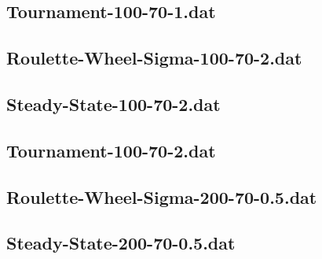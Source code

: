 \documentclass[titlepage, a4paper, 12pt]{article}
\begin{document}
\subsection{Tournament-100-70-1.dat}\label{Tournament-100-70-1.dat}
\begin{footnotesize}
  
\end{footnotesize}

\subsection{Roulette-Wheel-Sigma-100-70-2.dat}\label{Roulette-Wheel-Sigma-100-70-2.dat}
\begin{footnotesize}
  
\end{footnotesize}

\subsection{Steady-State-100-70-2.dat}\label{Steady-State-100-70-2.dat}
\begin{footnotesize}
  
\end{footnotesize}

\subsection{Tournament-100-70-2.dat}\label{Tournament-100-70-2.dat}
\begin{footnotesize}
  
\end{footnotesize}

\subsection{Roulette-Wheel-Sigma-200-70-0.5.dat}\label{Roulette-Wheel-Sigma-200-70-0.5.dat}
\begin{footnotesize}
  
\end{footnotesize}

\subsection{Steady-State-200-70-0.5.dat}\label{Steady-State-200-70-0.5.dat}
\begin{footnotesize}
  
\end{footnotesize}
\end{document}
